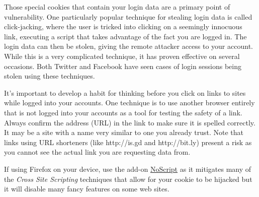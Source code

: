 Those special cookies that contain your login data are a primary point
of vulnerability. One particularly popular technique for stealing login
data is called click-jacking, where the user is tricked into clicking on
a seemingly innocuous link, executing a script that takes advantage of
the fact you are logged in. The login data can then be stolen, giving
the remote attacker access to your account. While this is a very
complicated technique, it has proven effective on several occasions.
Both Twitter and Facebook have seen cases of login sessions being stolen
using these techniques.

It's important to develop a habit for thinking before you click on links
to sites while logged into your accounts. One technique is to use
another browser entirely that is not logged into your accounts as a tool
for testing the safety of a link. Always confirm the address (URL) in
the link to make sure it is spelled correctly. It may be a site with a
name very similar to one you already trust. Note that links using URL
shorteners (like http://is.gd and http://bit.ly) present a risk as you
cannot see the actual link you are requesting data from.

If using Firefox on your device, use the add-on
\href{http://noscript.net}{NoScript} as it mitigates many of the
\emph{Cross Site Scripting} techniques that allow for your cookie to be
hijacked but it will disable many fancy features on some web sites.
